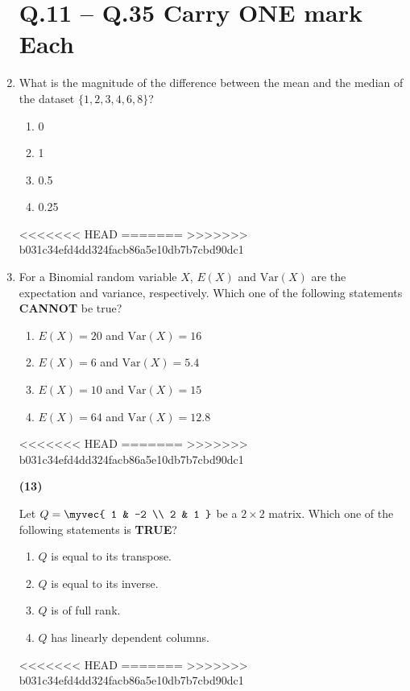 \documentclass[journal]{IEEEtran}
\begin{document}
\begin{enumerate}
\section*{Q.11 -- Q.35 Carry ONE mark Each}

\item  What is the magnitude of the difference between the mean and the median of the dataset \(\{1, 2, 3, 4, 6, 8\}\)?

\begin{enumerate}
    \item 0
    \item 1
    \item 0.5
    \item 0.25
\end{enumerate}
<<<<<<< HEAD
\hfill{}
=======
\hfill{}
>>>>>>> b031c34efd4dd324facb86a5e10db7b7cbd90dc1

 \item 
For a Binomial random variable \(X\), \(E(X)\) and \(\text{Var}(X)\) are the expectation and variance, respectively. Which one of the following statements \textbf{CANNOT} be true?

\begin{enumerate}
    \item \(E(X) = 20\) and \(\text{Var}(X) = 16\)
    \item \(E(X) = 6\) and \(\text{Var}(X) = 5.4\)
    \item \(E(X) = 10\) and \(\text{Var}(X) = 15\)
    \item \(E(X) = 64\) and \(\text{Var}(X) = 12.8\)
\end{enumerate}
<<<<<<< HEAD
\hfill{}
=======
\hfill{}
>>>>>>> b031c34efd4dd324facb86a5e10db7b7cbd90dc1

\textbf{(13)}

Let 
$
Q = \myvec{
1 & -2 \\
2 & 1
}
$
be a \(2 \times 2\) matrix. Which one of the following statements is \textbf{TRUE}?

\begin{enumerate}
    \item \(Q\) is equal to its transpose.
    \item \(Q\) is equal to its inverse.
    \item \(Q\) is of full rank.
    \item \(Q\) has linearly dependent columns.
\end{enumerate}
<<<<<<< HEAD
\hfill{}
=======
\hfill{}
>>>>>>> b031c34efd4dd324facb86a5e10db7b7cbd90dc1


\end{enumerate}
\end{document}
